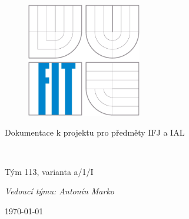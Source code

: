 \begin{titlepage}

\begin{figure}[!h]
  \centering
  \includegraphics[height=5cm]{img/logo.eps}
\end{figure}

\vfill

\begin{center}
\begin{Large}
Dokumentace k projektu pro předměty IFJ a IAL\\
\end{Large}
\bigskip
\begin{Huge}
\projname\\
\end{Huge}
\begin{large}
Tým 113, varianta a/1/I\\
\end{large}
\textit{Vedoucí týmu: Antonín Marko}\\
\end{center}

\vfill

\begin{center}
\begin{Large}
\today
\end{Large}
\end{center}

\vfill


\end{titlepage}
